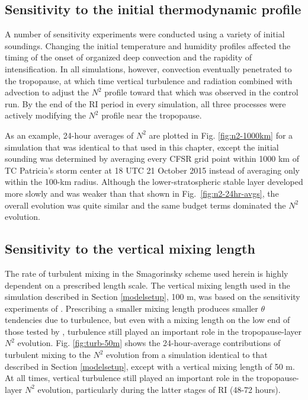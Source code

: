  \subsection{Sensitivity to the initial thermodynamic profile}
\label{thermosensitivity}
A number of sensitivity experiments were conducted using a variety of initial soundings.
Changing the initial temperature and humidity profiles affected the timing of the onset of organized deep convection and the rapidity of intensification.
In all simulations, however, convection eventually penetrated to the tropopause, at which time vertical turbulence and radiation combined with advection to adjust the $N^2$ profile toward that which was observed in the control run.
By the end of the RI period in every simulation, all three processes were actively modifying the $N^2$ profile near the tropopause.

As an example, 24-hour averages of $N^2$ are plotted in Fig. \ref{fig:n2-1000km} for a simulation that was identical to that used in this chapter, except the initial sounding was determined by averaging every CFSR grid point within 1000 km of TC Patricia's storm center at 18 UTC 21 October 2015 instead of averaging only within the 100-km radius.
Although the lower-stratospheric stable layer developed more slowly and was weaker than that shown in Fig.~\ref{fig:n2-24hr-avgs}, the overall evolution was quite similar and the same budget terms dominated the $N^2$ evolution.

 \subsection{Sensitivity to the vertical mixing length}
\label{lvsensitivity}
The rate of turbulent mixing in the Smagorinsky scheme used herein is highly dependent on a prescribed length scale.
The vertical mixing length used in the simulation described in Section \ref{modelsetup}, 100 m, was based on the sensitivity experiments of \cite{Bryan2012}.
Prescribing a smaller mixing length produces smaller $\theta$ tendencies due to turbulence, but even with a mixing length on the low end of those tested by \cite{Bryan2012}, turbulence still played an important role in the tropopause-layer $N^2$ evolution.
Fig. \ref{fig:turb-50m} shows the 24-hour-average contributions of turbulent mixing to the $N^2$ evolution from a simulation identical to that described in Section \ref{modelsetup}, except with a vertical mixing length of 50 m.
At all times, vertical turbulence still played an important role in the tropopause-layer $N^2$ evolution, particularly during the latter stages of RI (48-72 hours).

